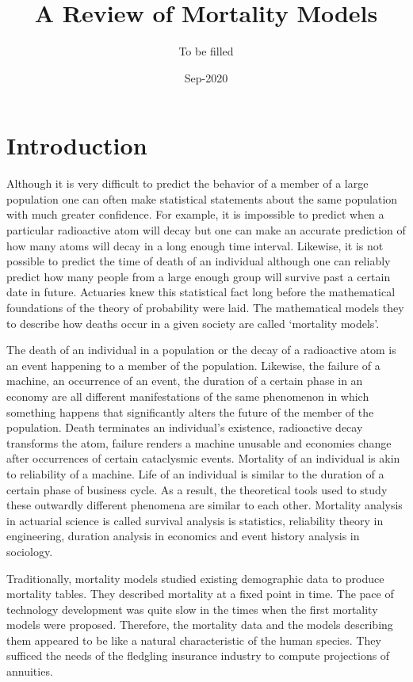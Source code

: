 \documentclass{article}
\title{A Review of Mortality Models}
\author{To be filled}
\date{Sep-2020}
\numberwithin{equation}{section}
\begin{document}
\maketitle
\section{Introduction}\label{s0}
Although it is very difficult to predict the behavior of a member of a large
population one can often make statistical statements about the same population 
with much greater 
confidence. For example, it is impossible to predict when a particular 
radioactive atom will decay but one can make an accurate prediction of how 
many atoms will decay in a long enough time interval. Likewise, it is not
possible to predict the time of death of an individual although one can reliably
predict how many people from a large enough group will survive past a certain
date in future. Actuaries knew this statistical fact long before the 
mathematical foundations of the theory of probability were laid. The 
mathematical models they to describe how deaths occur in a given society are
called `mortality models'.

The death of an individual in a population or the decay of a radioactive atom
is an event happening to a member of the population. Likewise, the failure of
a machine, an occurrence of an event, the duration of a certain phase in an
economy are all different manifestations of the same phenomenon in which 
something happens that significantly alters the future of the member of the
population. Death terminates an individual's existence, radioactive decay
transforms the atom, failure renders a machine unusable and economies change 
after occurrences of certain cataclysmic events. Mortality of an individual
is akin to reliability of a machine. Life of an individual is similar to
the duration of a certain phase of business cycle. As a result, the 
theoretical tools used to study these outwardly different phenomena are similar 
to each other. 
Mortality analysis in actuarial science is called survival analysis is 
statistics, reliability theory in engineering, duration analysis in economics 
and event history analysis in sociology.

Traditionally, mortality models studied existing demographic data to produce
mortality tables. They described mortality at a fixed point in time. The pace 
of technology development was quite slow in the times when the first mortality
models were proposed. Therefore, the mortality data and the models describing
them appeared to be like a natural characteristic of the human species. They
sufficed the needs of the fledgling insurance industry to compute projections
of annuities.
\end{document}
